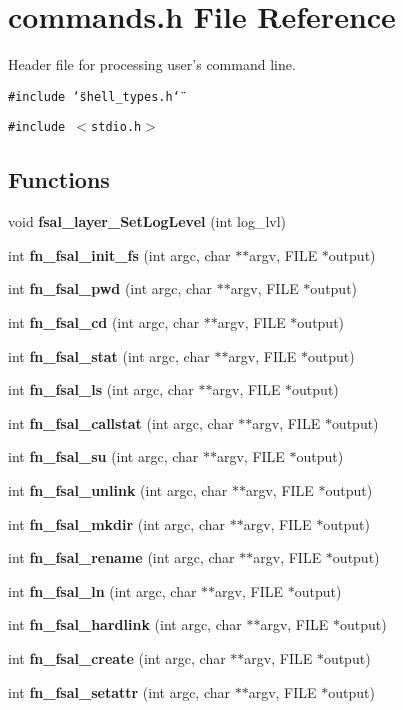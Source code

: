 \section{commands.h File Reference}
\label{commands_8h}
Header file for processing user's command line. 

{\tt \#include \char`\"{}shell\_\-types.h\char`\"{}}\par
{\tt \#include $<$stdio.h$>$}\par
\subsection*{Functions}
\begin{CompactItemize}
\item 
void {\bf fsal\_\-layer\_\-Set\-Log\-Level} (int log\_\-lvl)
\item 
int {\bf fn\_\-fsal\_\-init\_\-fs} (int argc, char $\ast$$\ast$argv, FILE $\ast$output)
\item 
int {\bf fn\_\-fsal\_\-pwd} (int argc, char $\ast$$\ast$argv, FILE $\ast$output)
\item 
int {\bf fn\_\-fsal\_\-cd} (int argc, char $\ast$$\ast$argv, FILE $\ast$output)
\item 
int {\bf fn\_\-fsal\_\-stat} (int argc, char $\ast$$\ast$argv, FILE $\ast$output)
\item 
int {\bf fn\_\-fsal\_\-ls} (int argc, char $\ast$$\ast$argv, FILE $\ast$output)
\item 
int {\bf fn\_\-fsal\_\-callstat} (int argc, char $\ast$$\ast$argv, FILE $\ast$output)
\item 
int {\bf fn\_\-fsal\_\-su} (int argc, char $\ast$$\ast$argv, FILE $\ast$output)
\item 
int {\bf fn\_\-fsal\_\-unlink} (int argc, char $\ast$$\ast$argv, FILE $\ast$output)
\item 
int {\bf fn\_\-fsal\_\-mkdir} (int argc, char $\ast$$\ast$argv, FILE $\ast$output)
\item 
int {\bf fn\_\-fsal\_\-rename} (int argc, char $\ast$$\ast$argv, FILE $\ast$output)
\item 
int {\bf fn\_\-fsal\_\-ln} (int argc, char $\ast$$\ast$argv, FILE $\ast$output)
\item 
int {\bf fn\_\-fsal\_\-hardlink} (int argc, char $\ast$$\ast$argv, FILE $\ast$output)
\item 
int {\bf fn\_\-fsal\_\-create} (int argc, char $\ast$$\ast$argv, FILE $\ast$output)
\item 
int {\bf fn\_\-fsal\_\-setattr} (int argc, char $\ast$$\ast$argv, FILE $\ast$output)

\end{CompactItemize}

